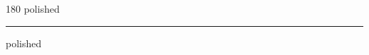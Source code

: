 
\begin{frame}
\begin{center}
\begin{turn}{180}
{\fontsize{2.5cm}{1em}\selectfont polished}
\end{turn}
\vspace{1em}\par  
\hrule
\vspace{1em}\par  
{\fontsize{2.5cm}{1em}\selectfont polished}
\end{center}
\end{frame}
